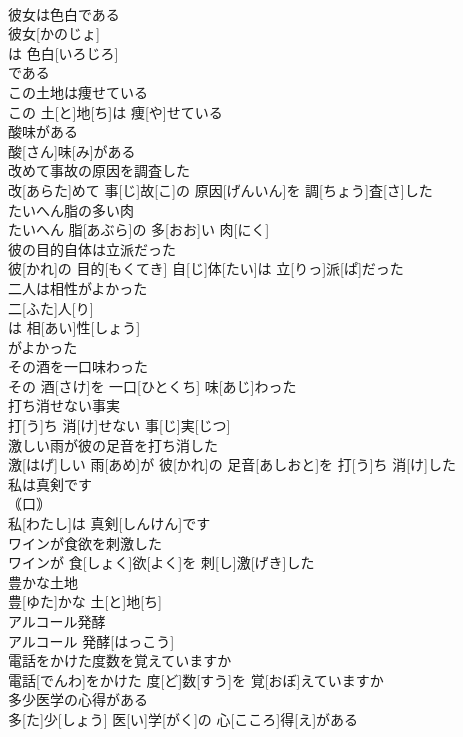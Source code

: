 \documentclass[8pt]{extreport}
\begin{document}
\begin{CJK}{UTF8}{min}
\\	彼女は色白である	
\\	彼女[かのじょ]
\\	は 色白[いろじろ]
\\	である
\\	この土地は痩せている	
\\	この 土[と]地[ち]は 痩[や]せている
\\	酸味がある	
\\	酸[さん]味[み]がある
\\	改めて事故の原因を調査した	
\\	改[あらた]めて 事[じ]故[こ]の 原因[げんいん]を 調[ちょう]査[さ]した
\\	たいへん脂の多い肉	
\\	たいへん 脂[あぶら]の 多[おお]い 肉[にく]
\\	彼の目的自体は立派だった	
\\	彼[かれ]の 目的[もくてき] 自[じ]体[たい]は 立[りっ]派[ぱ]だった
\\	二人は相性がよかった	
\\	二[ふた]人[り]
\\	は 相[あい]性[しょう] 
\\	がよかった 
\\	その酒を一口味わった	
\\	その 酒[さけ]を 一口[ひとくち] 味[あじ]わった
\\	打ち消せない事実	
\\	打[う]ち 消[け]せない 事[じ]実[じつ]
\\	激しい雨が彼の足音を打ち消した	
\\	激[はげ]しい 雨[あめ]が 彼[かれ]の 足音[あしおと]を 打[う]ち 消[け]した
\\	私は真剣です	
\\	｟口｠
\\	私[わたし]は 真剣[しんけん]です
\\	ワインが食欲を刺激した	
\\	ワインが 食[しょく]欲[よく]を 刺[し]激[げき]した
\\	豊かな土地	
\\	豊[ゆた]かな 土[と]地[ち]
\\	アルコール発酵	
\\	アルコール 発酵[はっこう]
\\	電話をかけた度数を覚えていますか	
\\	電話[でんわ]をかけた 度[ど]数[すう]を 覚[おぼ]えていますか
\\	多少医学の心得がある	
\\	多[た]少[しょう] 医[い]学[がく]の 心[こころ]得[え]がある

\end{CJK}
\end{document}
